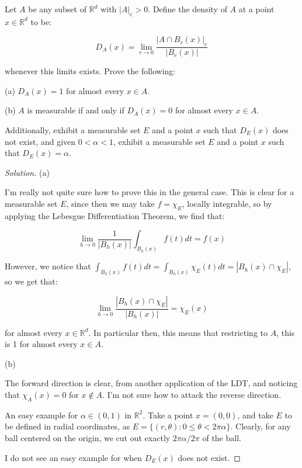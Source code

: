 \documentclass[10pt]{article}
\newenvironment{problem}[2][Problem]{\begin{trivlist}
\item[\hskip \labelsep {\bfseries #1}\hskip \labelsep {\bfseries #2.}]}{\end{trivlist}}
\begin{document}
\begin{problem}{5.5.19}

Let $A$ be any subset of $\mathbb{R}^d$ with $|A|_e > 0$. Define the density of $A$ at a point $x \in \mathbb{R}^d$ to be:

$$ D_A(x) = \lim_{r \to 0} \frac{|A \cap B_r(x)|_e}{|B_r(x)|} $$

whenever this limits exists. Prove the following:

(a) $D_A(x) = 1$ for almost every $x \in A$.

(b) $A$ is measurable if and only if $D_A(x) = 0$ for almost every $x \in A$.

Additionally, exhibit a measurable set $E$ and a point $x$ such that $D_E(x)$ does not exist, and given $0 < \alpha < 1$, exhibit a measurable set $E$ and a point $x$ such that $D_E(x) = \alpha$.

\end{problem}

\begin{proof}[Solution]

(a)

I'm really not quite sure how to prove this in the general case. This is clear for a measurable set $E$, since then we may take $f = \chi_E$, locally integrable, so by applying the Lebesgue Differentiation Theorem, we find that:

$$\lim_{h \to 0} \frac{1}{|B_h(x)|} \int_{B_h(x)} f(t) dt = f(x) $$

However, we notice that $ \int_{B_h(x)} f(t) dt =  \int_{B_h(x)} \chi_E(t) dt = |B_h(x) \cap \chi_E|$, so we get that:

$$  \lim_{h \to 0} \frac{ |B_h(x) \cap \chi_E|}{|B_h(x)|} = \chi_E(x) $$

for almost every $x \in \mathbb{R}^d$. In particular then, this means that restricting to $A$, this is 1 for almost every $x \in A$.

(b)

The forward direction is clear, from another application of the LDT, and noticing that $\chi_A(x) = 0$ for $x \not \in A$. I'm not sure how to attack the reverse direction.

An easy example for $\alpha \in (0,1)$ in $\mathbb{R}^2$. Take a point $x = (0,0)$, and take $E$ to be defined in radial coordinates, as $E = \{ (r,\theta) : 0 \leq \theta < 2\pi\alpha \}$. Clearly, for any ball centered on the origin, we cut out exactly $2 \pi\alpha/2\pi$ of the ball.

I do not see an easy example for when $D_E(x)$ does not exist.


\end{proof}
\end{document}

